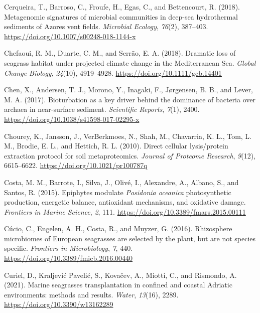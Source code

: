 \documentclass[
  12 pt,
]{book}
\newlength{\cslhangindent}
\newlength{\cslentryspacingunit} %
\newenvironment{CSLReferences}[2] %
 {%
  \setlength{\parindent}{0pt}
  \ifodd #1
  \let\oldpar\par
  \def\par{\hangindent=\cslhangindent\oldpar}
  \fi
  \setlength{\parskip}{#2\cslentryspacingunit}
 }%
 {}
\begin{document}
\begin{CSLReferences}{1}{0}
\leavevmode{}%
Cerqueira, T., Barroso, C., Froufe, H., Egas, C., and Bettencourt, R. (2018). Metagenomic signatures of microbial communities in deep-sea hydrothermal sediments of {Azores} vent fields. \emph{Microbial Ecology}, \emph{76}(2), 387--403. \url{https://doi.org/10.1007/s00248-018-1144-x}

\leavevmode{}%
Chefaoui, R. M., Duarte, C. M., and Serrão, E. A. (2018). Dramatic loss of seagrass habitat under projected climate change in the {Mediterranean Sea}. \emph{Global Change Biology}, \emph{24}(10), 4919--4928. \url{https://doi.org/10.1111/gcb.14401}

\leavevmode{}%
Chen, X., Andersen, T. J., Morono, Y., Inagaki, F., Jørgensen, B. B., and Lever, M. A. (2017). Bioturbation as a key driver behind the dominance of bacteria over archaea in near-surface sediment. \emph{Scientific Reports}, \emph{7}(1), 2400. \url{https://doi.org/10.1038/s41598-017-02295-x}

\leavevmode{}%
Chourey, K., Jansson, J., VerBerkmoes, N., Shah, M., Chavarria, K. L., Tom, L. M., Brodie, E. L., and Hettich, R. L. (2010). Direct cellular lysis/protein extraction protocol for soil metaproteomics. \emph{Journal of Proteome Research}, \emph{9}(12), 6615--6622. \url{https://doi.org/10.1021/pr100787q}

\leavevmode{}%
Costa, M. M., Barrote, I., Silva, J., Olivé, I., Alexandre, A., Albano, S., and Santos, R. (2015). Epiphytes modulate {{\emph{Posidonia oceanica}}} photosynthetic production, energetic balance, antioxidant mechanisms, and oxidative damage. \emph{Frontiers in Marine Science}, \emph{2}, 111. \url{https://doi.org/10.3389/fmars.2015.00111}

\leavevmode{}%
Cúcio, C., Engelen, A. H., Costa, R., and Muyzer, G. (2016). Rhizosphere microbiomes of {European} seagrasses are selected by the plant, but are not species specific. \emph{Frontiers in Microbiology}, \emph{7}, 440. \url{https://doi.org/10.3389/fmicb.2016.00440}

\leavevmode{}%
Curiel, D., Kraljević Pavelić, S., Kovačev, A., Miotti, C., and Rismondo, A. (2021). Marine seagrasses transplantation in confined and coastal {Adriatic} environments: methods and results. \emph{Water}, \emph{13}(16), 2289. \url{https://doi.org/10.3390/w13162289}


\end{CSLReferences}
\end{document}
